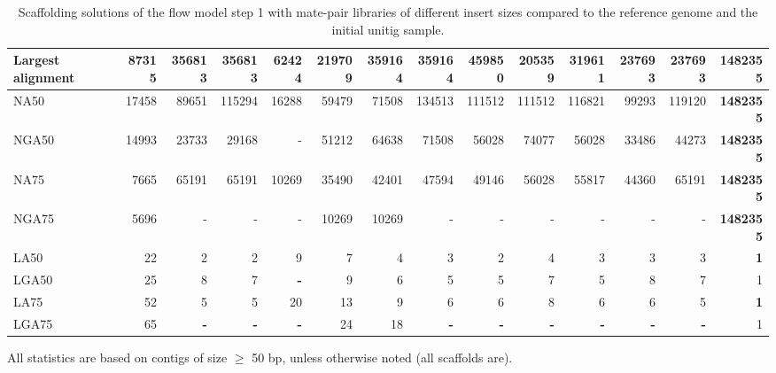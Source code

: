 \documentclass[12pt]{article}
\begin{document}
\begin{table}[ht]
\begin{center}
{\begin{tabular}{|l*{13}{|r}|}
Largest alignment & 87315 & 356813 & 356813 & 62424 & 219709 & 359164 & 359164 & 459850 & 205359 & 319611 & 237693 & 237693 & {\bf 1482355} \\ \hline
NA50 & 17458 & 89651 & 115294 & 16288 & 59479 & 71508 & 134513 & 111512 & 111512 & 116821 & 99293 & 119120 & {\bf 1482355} \\ \hline
NGA50 & 14993 & 23733 & 29168 & - & 51212 & 64638 & 71508 & 56028 & 74077 & 56028 & 33486 & 44273 & {\bf 1482355} \\ \hline
NA75 & 7665 & 65191 & 65191 & 10269 & 35490 & 42401 & 47594 & 49146 & 56028 & 55817 & 44360 & 65191 & {\bf 1482355} \\ \hline
NGA75 & 5696 & - & - & - & 10269 & 10269 & - & - & - & - & - & - & {\bf 1482355} \\ \hline
LA50 & 22 & 2 & 2 & 9 & 7 & 4 & 3 & 2 & 4 & 3 & 3 & 3 & {\bf 1} \\ \hline
LGA50 & 25 & 8 & 7 & {\bf -} & 9 & 6 & 5 & 5 & 7 & 5 & 8 & 7 & 1 \\ \hline
LA75 & 52 & 5 & 5 & 20 & 13 & 9 & 6 & 6 & 8 & 6 & 6 & 5 & {\bf 1} \\ \hline
LGA75 & 65 & {\bf -} & {\bf -} & {\bf -} & 24 & 18 & {\bf -} & {\bf -} & {\bf -} & {\bf -} & {\bf -} & {\bf -} & 1 \\ \hline
\end{tabular}
}
\caption{Scaffolding solutions of the flow model step 1 with mate-pair libraries of different insert sizes compared to the reference genome and the initial unitig sample.}
\footnotesize All statistics are based on contigs of size $\geq$ 50 bp, unless otherwise noted (all scaffolds are).
\label{tab:insert}
\end{center}
\end{table}
\end{document}
